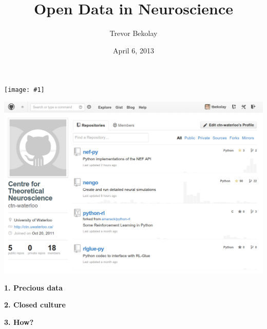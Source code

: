 \documentclass[17pt]{beamer}
\title{Open Data in Neuroscience}
\author{Trevor Bekolay}
\institute{University of Waterloo}
\date{April 6, 2013}
\newcommand{\cf}[2]{
    \begin{center}
      \texttt{[image: \#1]}
    \end{center}
  }
\begin{document}
\frame[plain]{\titlepage}

\begin{frame}[plain]
  \cf{spaun}{0.73}
\end{frame}

\begin{frame}[plain]
  \hspace*{-.04\columnwidth}\includegraphics[width=1.09\columnwidth]{github}
\end{frame}

\begin{frame}[plain]
  \begin{center}
    \begin{huge}
      \textbf{1. Precious data}
    \end{huge}
  \end{center}
\end{frame}

\begin{frame}[plain]
  \begin{center}
    \begin{huge}
      \textbf{2. Closed culture}
    \end{huge}
  \end{center}
\end{frame}

\begin{frame}[plain]
  \begin{center}
    \begin{huge}
      \textbf{3. How?}
    \end{huge}
  \end{center}
\end{frame}
\end{document}
